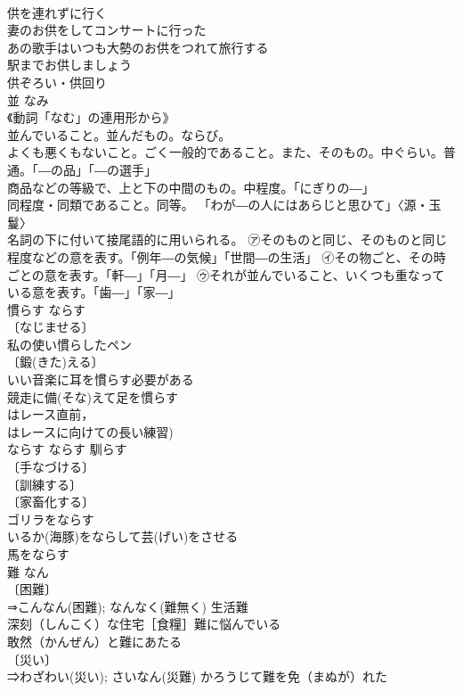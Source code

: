 \documentclass[8pt]{extreport}
\begin{document}
\begin{CJK}{UTF8}{min}
\\	供を連れずに行く 
\\	妻のお供をしてコンサートに行った 
\\	あの歌手はいつも大勢のお供をつれて旅行する 
\\	駅までお供しましょう 
\\	供ぞろい・供回り 
\\	並	なみ	
\\	《動詞「なむ」の連用形から》 
\\	並んでいること。並んだもの。ならび。 
\\	よくも悪くもないこと。ごく一般的であること。また、そのもの。中ぐらい。普通。「―の品」「―の選手」 
\\	商品などの等級で、上と下の中間のもの。中程度。「にぎりの―」 
\\	同程度・同類であること。同等。 「わが―の人にはあらじと思ひて」〈源・玉鬘〉 
\\	名詞の下に付いて接尾語的に用いられる。 ㋐そのものと同じ、そのものと同じ程度などの意を表す。「例年―の気候」「世間―の生活」 ㋑その物ごと、その時ごとの意を表す。「軒―」「月―」 ㋒それが並んでいること、いくつも重なっている意を表す。「歯―」「家―」
\\	慣らす	ならす	
\\	〔なじませる〕
\\	私の使い慣らしたペン 
\\	〔鍛(きた)える〕
\\	いい音楽に耳を慣らす必要がある 
\\	競走に備(そな)えて足を慣らす 
\\	はレース直前，
\\	はレースに向けての長い練習)
\\	ならす	ならす	馴らす 
\\	〔手なづける〕
\\	〔訓練する〕
\\	〔家畜化する〕
\\	ゴリラをならす 
\\	いるか(海豚)をならして芸(げい)をさせる 
\\	馬をならす 
\\	難	なん	
\\	〔困難〕
\\	⇒こんなん(困難); なんなく(難無く) 生活難 
\\	深刻（しんこく）な住宅［食糧］難に悩んでいる 
\\	敢然（かんぜん）と難にあたる 
\\	〔災い〕
\\	⇒わざわい(災い); さいなん(災難) かろうじて難を免（まぬが）れた 

\end{CJK}
\end{document}
